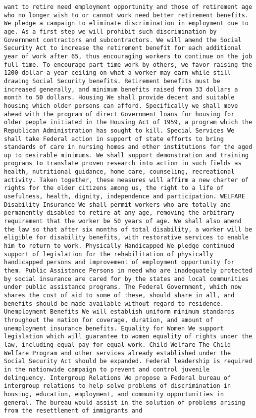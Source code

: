 \documentclass[
]{article}
\begin{document}
\begin{verbatim}
want to retire need employment opportunity and those of retirement age who no longer wish to or cannot work need better retirement benefits. We pledge a campaign to eliminate discrimination in employment due to age. As a first step we will prohibit such discrimination by Government contractors and subcontractors. We will amend the Social Security Act to increase the retirement benefit for each additional year of work after 65, thus encouraging workers to continue on the job full time. To encourage part time work by others, we favor raising the 1200 dollar-a-year ceiling on what a worker may earn while still drawing Social Security benefits. Retirement benefits must be increased generally, and minimum benefits raised from 33 dollars a month to 50 dollars. Housing We shall provide decent and suitable housing which older persons can afford. Specifically we shall move ahead with the program of direct Government loans for housing for older people initiated in the Housing Act of 1959, a program which the Republican Administration has sought to kill. Special Services We shall take Federal action in support of state efforts to bring standards of care in nursing homes and other institutions for the aged up to desirable minimums. We shall support demonstration and training programs to translate proven research into action in such fields as health, nutritional guidance, home care, counseling, recreational activity. Taken together, these measures will affirm a new charter of rights for the older citizens among us, the right to a life of usefulness, health, dignity, independence and participation. WELFARE Disability Insurance We shall permit workers who are totally and permanently disabled to retire at any age, removing the arbitrary requirement that the worker be 50 years of age. We shall also amend the law so that after six months of total disability, a worker will be eligible for disability benefits, with restorative services to enable him to return to work. Physically Handicapped We pledge continued support of legislation for the rehabilitation of physically handicapped persons and improvement of employment opportunity for them. Public Assistance Persons in need who are inadequately protected by social insurance are cared for by the states and local communities under public assistance programs. The Federal Government, which now shares the cost of aid to some of these, should share in all, and benefits should be made available without regard to residence. Unemployment Benefits We will establish uniform minimum standards throughout the nation for coverage, duration, and amount of unemployment insurance benefits. Equality for Women We support legislation which will guarantee to women equality of rights under the law, including equal pay for equal work. Child Welfare The Child Welfare Program and other services already established under the Social Security Act should be expanded. Federal leadership is required in the nationwide campaign to prevent and control juvenile delinquency. Intergroup Relations We propose a Federal bureau of intergroup relations to help solve problems of discrimination in housing, education, employment, and community opportunities in general. The bureau would assist in the solution of problems arising from the resettlement of immigrants and 
\end{verbatim}
\end{document}

